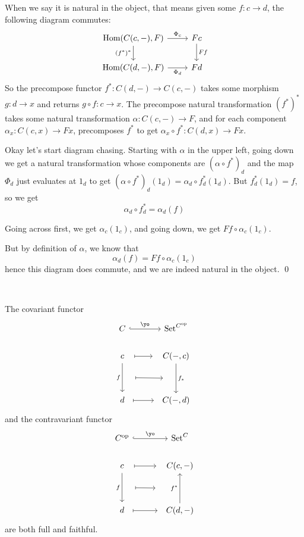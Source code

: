 \documentclass{article}
\begin{document}
\begin{customproof}
When we say it is natural in the object, that means given some $f: c \to d$, the following diagram commutes: \[\begin{tikzcd}
	\text{Hom}(C(c,-), F) & Fc\\
	\text{Hom}(C(d,-), F) & Fd
	\arrow[from=1-1, to=2-1, "(f^*)^*"']
	\arrow[from=1-1, to=1-2, "\Phi_c"]
	\arrow[from=2-1, to=2-2, "\Phi_d"']
	\arrow[from=1-2, to=2-2, "Ff"]
\end{tikzcd}\]So the precompose functor $f^*: C(d,-) \to C(c,-)$ takes some morphism $g: d \to x$ and returns $g \circ f: c \to x$. The precompose natural transformation $(f^*)^*$ takes some natural transformation $\alpha: C(c,-) \to F$, and for each component $\alpha_x: C(c,x) \to Fx$, precomposes $f^*$ to get $\alpha_x \circ f^*: C(d,x) \to Fx$. 

Okay let's start diagram chasing. Starting with $\alpha$ in the upper left, going down we get a natural transformation whose components are $(\alpha \circ f^*)_d$ and the map $\Phi_d$ just evaluates at $1_d$ to get $(\alpha \circ f^*)_d(1_d) = \alpha_d \circ f^*_d (1_d)$. But $f^*_d(1_d) = f$, so we get $$\alpha_d \circ f^*_d = \alpha_d(f)$$

Going across first, we get $\alpha_c(1_c)$, and going down, we get $Ff \circ \alpha_c(1_c)$.

But by definition of $\alpha$, we know that $$\alpha_d(f) = Ff\circ \alpha_c(1_c)$$hence this diagram does commute, and we are indeed natural in the object. \qed
\end{customproof}

\begin{corollary}
\

The covariant functor \[\begin{tikzcd}[column sep=large]
	C & \text{Set}^{C^\text{op}}\\
	c & C(-,c)\\
	\\
	d & C(-,d)
	\arrow[from=1-1, to=1-2, hook, "\yo"]
	\arrow[from=2-1, to=2-2, mapsto, shorten=8]
	\arrow[from=2-1, to=4-1, "f"'{name=F}, shorten=2]
	\arrow[from=2-2, to=4-2, "f_*"{name=G}]
	\arrow[from=F, to=G, mapsto, shorten=16]
	\arrow[from=4-1, to=4-2, mapsto, shorten=6]
\end{tikzcd}\]and the contravariant functor \[\begin{tikzcd}[column sep=large]
	C^\text{op} & \text{Set}^C\\
	c & C(c,-)\\
	\\
	d & C(d,-)
	\arrow[from=1-1, to=1-2, hook, "\yo"]
	\arrow[from=2-1, to=2-2, mapsto, shorten=8]
	\arrow[from=2-1, to=4-1, "f"'{name=F}, shorten=2]
	\arrow[from=4-2, to=2-2, "f^*"{name=G}]
	\arrow[from=F, to=G, mapsto, shorten=16]
	\arrow[from=4-1, to=4-2, mapsto, shorten=6]
\end{tikzcd}\]are both full and faithful.
\end{corollary}
\end{document}
